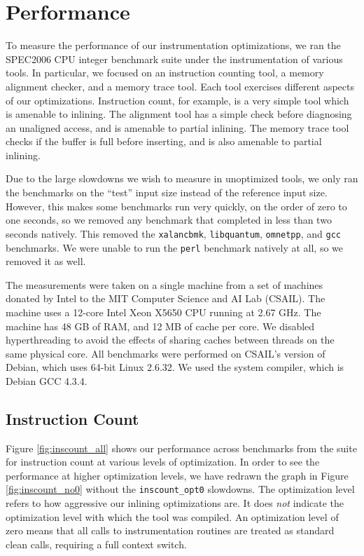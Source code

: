 \chapter{Performance}
\label{sec:performance}

To measure the performance of our instrumentation optimizations, we ran the
SPEC2006 CPU integer benchmark suite under the instrumentation of various tools.
In particular, we focused on an instruction counting tool, a memory alignment
checker, and a memory trace tool.  Each tool exercises different aspects of our
optimizations.  Instruction count, for example, is a very simple tool which is
amenable to inlining.  The alignment tool has a simple check before diagnosing
an unaligned access, and is amenable to partial inlining.  The memory trace tool
checks if the buffer is full before inserting, and is also amenable to partial
inlining.

Due to the large slowdowns we wish to measure in unoptimized tools, we only ran
the benchmarks on the ``test'' input size instead of the reference input size.
However, this makes some benchmarks run very quickly, on the order of zero to
one seconds, so we removed any benchmark that completed in less than two seconds
natively.  This removed the {\tt xalancbmk}, {\tt libquantum}, {\tt omnetpp},
and {\tt gcc} benchmarks.  We were unable to run the {\tt perl} benchmark
natively at all, so we removed it as well.

The measurements were taken on a single machine from a set of machines donated
by Intel to the MIT Computer Science and AI Lab (CSAIL).  The machine uses a
12-core Intel Xeon X5650 CPU running at 2.67 GHz.  The machine has 48 GB of RAM,
and 12 MB of cache per core.  We disabled hyperthreading to avoid the effects of
sharing caches between threads on the same physical core.  All benchmarks were
performed on CSAIL's version of Debian, which uses 64-bit Linux 2.6.32.  We used
the system compiler, which is Debian GCC 4.3.4.

\section{Instruction Count}

Figure \ref{fig:inscount_all} shows our performance across benchmarks from the
suite for instruction count at various levels of optimization.  In order to see
the performance at higher optimization levels, we have redrawn the graph in
Figure \ref{fig:inscount_no0} without the {\tt inscount\_opt0} slowdowns.  The
optimization level refers to how aggressive our inlining optimizations are.  It
does {\em not} indicate the optimization level with which the tool was compiled.
An optimization level of zero means that all calls to instrumentation routines
are treated as standard clean calls, requiring a full context switch.

